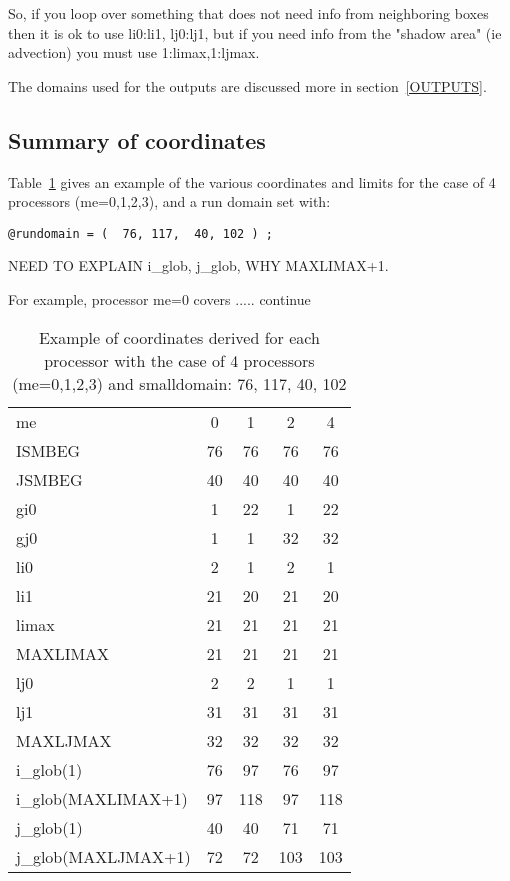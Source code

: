 So, if you loop over something that does not need
info from neighboring boxes then it is ok to use li0:li1, lj0:lj1,
but if you need info from the "shadow area" (ie advection)  you must use
1:limax,1:ljmax.
\bigskip
\bigskip


The domains used for the outputs are discussed more in section~\ref{OUTPUTS}.



\subsection{Summary of coordinates}


Table~\ref{Tab:COORDS}
gives an example of the various coordinates and limits for the case of
4 processors (me=0,1,2,3), and a run domain set with:

\begin{verbatim}
@rundomain = (  76, 117,  40, 102 ) ; 
\end{verbatim}

NEED TO EXPLAIN i\_glob, j\_glob, WHY MAXLIMAX+1.

\begin{table}
\caption{Example of coordinates derived for each processor with
the case of 4 processors (me=0,1,2,3) and smalldomain:  76, 117,  40, 102}
For example, processor me=0 covers ..... continue


\label{Tab:COORDS}
\begin{tabular}{lcccc}\\
me& 0& 1& 2& 4\\
ISMBEG& 76& 76& 76& 76\\
JSMBEG& 40& 40& 40& 40\\
gi0& 1& 22& 1& 22\\
gj0& 1& 1& 32& 32\\
li0& 2& 1& 2& 1\\
li1& 21& 20& 21& 20\\
limax& 21& 21& 21& 21\\
MAXLIMAX& 21& 21& 21& 21\\
lj0& 2& 2& 1& 1\\
lj1& 31& 31& 31& 31\\
MAXLJMAX& 32& 32& 32& 32\\
i\_glob(1)& 76& 97& 76& 97\\
i\_glob(MAXLIMAX+1)& 97& 118& 97& 118\\
j\_glob(1)& 40& 40& 71& 71\\
j\_glob(MAXLJMAX+1)& 72& 72& 103& 103\\
\end{tabular}
\end{table}

